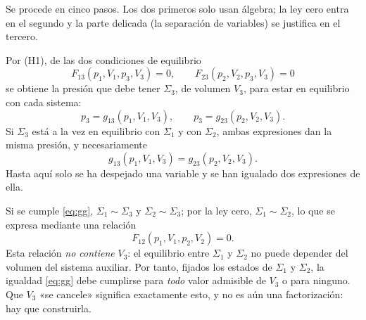 \begin{demostracion}
Se procede en cinco pasos. Los dos primeros solo usan álgebra; la ley cero entra en el segundo y la
parte delicada (la separación de variables) se justifica en el tercero.

 Por (H1), de las dos condiciones de equilibrio
\[
  F_{13}(p_1,V_1,p_3,V_3)=0,\qquad F_{23}(p_2,V_2,p_3,V_3)=0
\]
se obtiene la presión que debe tener $\Sigma_3$, de volumen $V_3$, para estar en equilibrio con cada
sistema:
\begin{equation}\label{eq:g}
  p_3=g_{13}(p_1,V_1,V_3),\qquad p_3=g_{23}(p_2,V_2,V_3).
\end{equation}
Si $\Sigma_3$ está a la vez en equilibrio con $\Sigma_1$ y con $\Sigma_2$, ambas expresiones dan la
misma presión, y necesariamente
\begin{equation}\label{eq:gg}
  g_{13}(p_1,V_1,V_3)=g_{23}(p_2,V_2,V_3).
\end{equation}
Hasta aquí solo se ha despejado una variable y se han igualado dos expresiones de ella.

 Si se cumple \eqref{eq:gg}, $\Sigma_1\sim\Sigma_3$ y
$\Sigma_2\sim\Sigma_3$; por la ley cero, $\Sigma_1\sim\Sigma_2$, lo que se expresa mediante una relación
\[
  F_{12}(p_1,V_1,p_2,V_2)=0.
\]
Esta relación \emph{no contiene} $V_3$: el equilibrio entre $\Sigma_1$ y $\Sigma_2$ no puede depender
del volumen del sistema auxiliar. Por tanto, fijados los estados de $\Sigma_1$ y $\Sigma_2$, la igualdad
\eqref{eq:gg} debe cumplirse para \emph{todo} valor admisible de $V_3$ o para ninguno. Que $V_3$ «se
cancele» significa exactamente esto, y no es aún una factorización: hay que construirla.


\end{demostracion}
